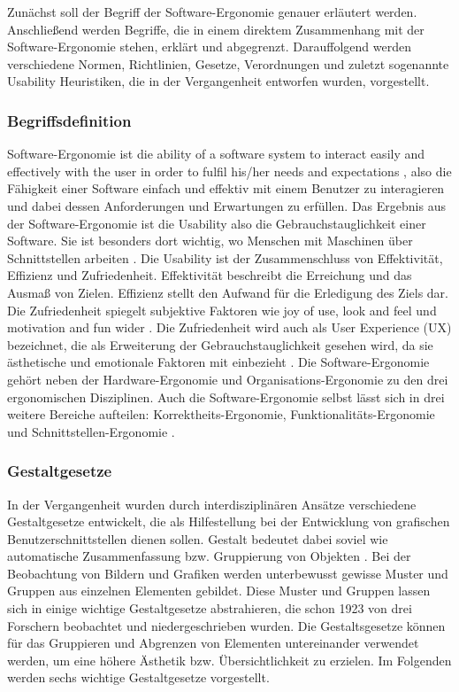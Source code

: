 Zunächst soll der Begriff der Software-Ergonomie genauer erläutert werden. Anschließend werden Begriffe, die in einem direktem Zusammenhang mit der Software-Ergonomie stehen, erklärt und abgegrenzt. Darauffolgend werden verschiedene Normen, Richtlinien, Gesetze, Verordnungen und zuletzt sogenannte Usability Heuristiken, die in der Vergangenheit entworfen wurden, vorgestellt.

\subsubsection{Begriffsdefinition}
Software-Ergonomie ist die \glqq ability of a software system to interact easily and effectively with the user in order to fulfil his/her needs and expectations\grqq{} \citep[4]{Oppermann1988einfuehrung}, also die Fähigkeit einer Software einfach und effektiv mit einem Benutzer zu interagieren und dabei dessen Anforderungen und Erwartungen zu erfüllen. Das Ergebnis aus der Software-Ergonomie ist die Usability also die Gebrauchstauglichkeit einer Software. Sie ist besonders dort wichtig, wo Menschen mit Maschinen über Schnittstellen arbeiten \citep[vgl.][]{usabilityDe}. Die Usability ist der Zusammenschluss von Effektivität, Effizienz und Zufriedenheit. Effektivität beschreibt die Erreichung und das Ausmaß von Zielen. Effizienz stellt den Aufwand für die Erledigung des Ziels dar. Die Zufriedenheit spiegelt subjektive Faktoren wie \glqq joy of use\grqq{}, \glqq look and feel\grqq{} und \glqq motivation and fun\grqq{} wider \citep[vgl.][]{Holzinger2011human}. Die Zufriedenheit wird auch als User Experience (UX) bezeichnet, die als Erweiterung der Gebrauchstauglichkeit gesehen wird, da sie ästhetische und emotionale Faktoren mit einbezieht \citep[vgl.][]{usabilityDe}. Die Software-Ergonomie gehört neben der Hardware-Ergonomie und Organisations-Ergonomie zu den drei ergonomischen Disziplinen. Auch die Software-Ergonomie selbst lässt sich in drei weitere Bereiche aufteilen: Korrektheits-Ergonomie, Funktionalitäts-Ergonomie und Schnittstellen-Ergonomie \citep[vgl.][]{Oppermann1988einfuehrung}.

\subsubsection{Gestaltgesetze}
In der Vergangenheit wurden durch interdisziplinären Ansätze verschiedene Gestaltgesetze entwickelt, die als Hilfestellung bei der Entwicklung von grafischen Benutzerschnittstellen dienen sollen. Gestalt bedeutet dabei soviel wie automatische Zusammenfassung bzw. Gruppierung von Objekten \citep[vgl.][59]{Dahm2006}. Bei der Beobachtung von Bildern und Grafiken werden unterbewusst gewisse Muster und Gruppen aus einzelnen Elementen gebildet. Diese Muster und Gruppen lassen sich in einige wichtige Gestaltgesetze abstrahieren, die schon 1923 von drei Forschern beobachtet und niedergeschrieben wurden. Die Gestaltsgesetze können für das Gruppieren und Abgrenzen von Elementen untereinander verwendet werden, um eine höhere Ästhetik bzw. Übersichtlichkeit zu erzielen. Im Folgenden werden sechs wichtige Gestaltgesetze vorgestellt.

